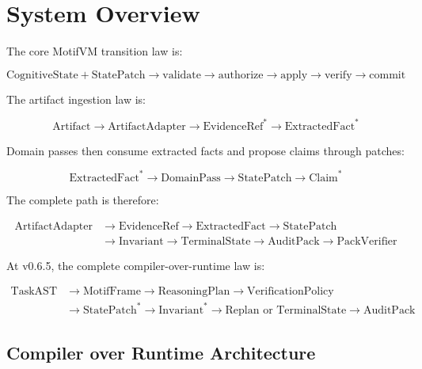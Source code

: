 \documentclass[11pt]{article}
\begin{document}
\section{System Overview}

The core MotifVM transition law is:

\[
\text{CognitiveState} + \text{StatePatch}
\rightarrow \text{validate}
\rightarrow \text{authorize}
\rightarrow \text{apply}
\rightarrow \text{verify}
\rightarrow \text{commit}
\]

The artifact ingestion law is:

\[
\text{Artifact}
\rightarrow \text{ArtifactAdapter}
\rightarrow \text{EvidenceRef}^{*}
\rightarrow \text{ExtractedFact}^{*}
\]

Domain passes then consume extracted facts and propose claims through patches:

\[
\text{ExtractedFact}^{*}
\rightarrow \text{DomainPass}
\rightarrow \text{StatePatch}
\rightarrow \text{Claim}^{*}
\]

The complete path is therefore:

\begin{align*}
\text{ArtifactAdapter} &\rightarrow \text{EvidenceRef}
\rightarrow \text{ExtractedFact}
\rightarrow \text{StatePatch} \\
&\rightarrow \text{Invariant}
\rightarrow \text{TerminalState}
\rightarrow \text{AuditPack}
\rightarrow \text{PackVerifier}
\end{align*}

At v0.6.5, the complete compiler-over-runtime law is:

\begin{align*}
\text{TaskAST}
&\rightarrow \text{MotifFrame}
\rightarrow \text{ReasoningPlan}
\rightarrow \text{VerificationPolicy} \\
&\rightarrow \text{StatePatch}^{*}
\rightarrow \text{Invariant}^{*}
\rightarrow \text{Replan or TerminalState}
\rightarrow \text{AuditPack}
\end{align*}

\subsection{Compiler over Runtime Architecture}
\end{document}
